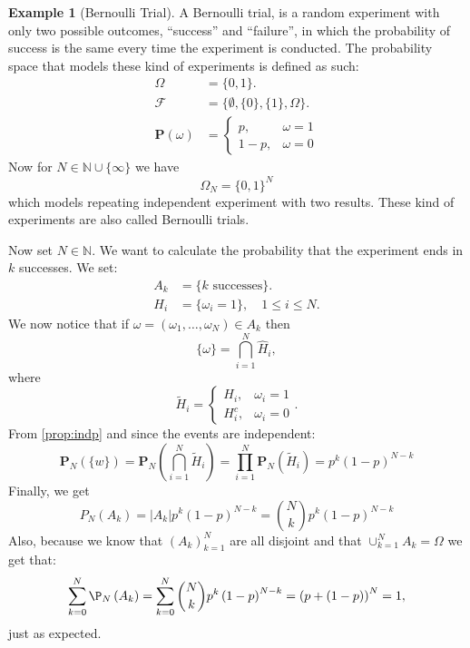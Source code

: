 \documentclass[11pt,a4paper]{article}
\theoremstyle{definition}
\newtheorem{example}{Example}[section]
\theoremstyle{plain}
\newcommand{\N}{\mathbb{N}}
\newcommand{\Prob}{\mathbf{P}}
\newcommand{\abs}[1]{\left\lvert #1\right\rvert}
\begin{document}
  \begin{example}[Bernoulli Trial]
    A Bernoulli trial, is a random experiment with only two possible outcomes,
    ``success'' and ``failure'', in which the probability of success is the 
    same every time the experiment is conducted. The probability space that
    models these kind of experiments is defined as such:
    \begin{align*}
      \Omega &= \{0, 1\}. \\
      \mathcal F &= \{\emptyset, \{0\}, \{1\}, \Omega\}. \\
      \Prob(\omega) &=
      \begin{cases}
        p, &\omega = 1 \\
        1-p, &\omega= 0
      \end{cases}
    \end{align*}
    Now for $N \in \N \cup \{\infty\}$ we have
    \[ \Omega_N = \{0, 1\}^N \]
    which models repeating independent experiment with two results.
    These kind of experiments are also called Bernoulli trials.

    Now set $N \in \N$. We want to calculate the probability that the
    experiment ends in $k$ successes. We set:
    \begin{align*}
      A_k &= \{\text{$k$ successes}\}. \\
      H_i &= \{\omega_i = 1\}, \quad 1 \le i \le N.
    \end{align*}
    We now notice that if $\omega = (\omega_1,\dots,\omega_N) \in A_k$ then
    \[
      \{\omega\} = \bigcap_{i=1}^{N} \widehat{H}_i,
    \]
    where
    \[
      \widetilde{H}_{i} = 
      \begin{cases}
        H_{i}, &\omega_{i} = 1 \\ 
        H_{i}^{c}, &\omega_{i} = 0
      \end{cases}.
    \]
    From \autoref{prop:indp} and since the events are independent:
    \[
      \Prob_N\left(\{w\}\right) =
      \Prob_N\left(\bigcap_{i=1}^{N} \widetilde{H}_i \right) = 
      \prod_{i=1}^{N} \Prob_N(\widetilde{H}_i) =
      p^k (1-p)^{N-k}
    \]
    Finally, we get
    \[
      P_N(A_k) = 
      \abs{A_k} p^k (1-p)^{N-k} = 
      \binom{N}{k} p^k (1-p)^{N-k}
    \]
    Also, because we know that $(A_k)_{k=1}^{N}$ are all disjoint and that
    $\cup_{k=1}^{N} A_k = \Omega$ we get that:
    \[
      \sum_{k=0}^{N}\P_{N}\left(A_{k}\right) = 
      \sum_{k=0}^{N}{\binom{N}{k}}p^{k}\left(1-p\right)^{N-k} = 
      \left(p+\left(1-p\right)\right)^{N} = 1,
    \]
    just as expected.
  \end{example}
\end{document}

